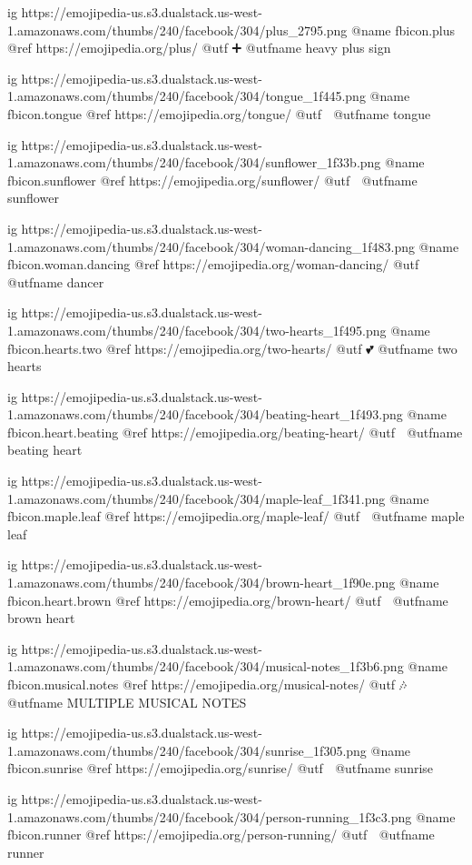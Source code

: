 	ig https://emojipedia-us.s3.dualstack.us-west-1.amazonaws.com/thumbs/240/facebook/304/plus_2795.png
	@name fbicon.plus
	@ref https://emojipedia.org/plus/
	@utf ➕
	@utfname heavy plus sign

	ig https://emojipedia-us.s3.dualstack.us-west-1.amazonaws.com/thumbs/240/facebook/304/tongue_1f445.png
	@name fbicon.tongue
	@ref https://emojipedia.org/tongue/
	@utf 👅
	@utfname tongue

	ig https://emojipedia-us.s3.dualstack.us-west-1.amazonaws.com/thumbs/240/facebook/304/sunflower_1f33b.png
	@name fbicon.sunflower
	@ref https://emojipedia.org/sunflower/
	@utf 🌻
	@utfname sunflower

	ig https://emojipedia-us.s3.dualstack.us-west-1.amazonaws.com/thumbs/240/facebook/304/woman-dancing_1f483.png
	@name fbicon.woman.dancing
	@ref https://emojipedia.org/woman-dancing/
	@utf 💃
	@utfname dancer

	ig https://emojipedia-us.s3.dualstack.us-west-1.amazonaws.com/thumbs/240/facebook/304/two-hearts_1f495.png
	@name fbicon.hearts.two
	@ref https://emojipedia.org/two-hearts/
	@utf 💕
	@utfname two hearts

	ig https://emojipedia-us.s3.dualstack.us-west-1.amazonaws.com/thumbs/240/facebook/304/beating-heart_1f493.png
	@name fbicon.heart.beating
	@ref https://emojipedia.org/beating-heart/
	@utf 💓
	@utfname beating heart

	ig https://emojipedia-us.s3.dualstack.us-west-1.amazonaws.com/thumbs/240/facebook/304/maple-leaf_1f341.png
	@name fbicon.maple.leaf
	@ref https://emojipedia.org/maple-leaf/
	@utf 🍁
	@utfname maple leaf

	ig https://emojipedia-us.s3.dualstack.us-west-1.amazonaws.com/thumbs/240/facebook/304/brown-heart_1f90e.png
	@name fbicon.heart.brown
	@ref https://emojipedia.org/brown-heart/
	@utf 🤎
	@utfname brown heart

	ig https://emojipedia-us.s3.dualstack.us-west-1.amazonaws.com/thumbs/240/facebook/304/musical-notes_1f3b6.png
	@name fbicon.musical.notes
	@ref https://emojipedia.org/musical-notes/
	@utf 🎶
	@utfname MULTIPLE MUSICAL NOTES

	ig https://emojipedia-us.s3.dualstack.us-west-1.amazonaws.com/thumbs/240/facebook/304/sunrise_1f305.png
	@name fbicon.sunrise
	@ref https://emojipedia.org/sunrise/
	@utf 🌅
	@utfname sunrise

	ig https://emojipedia-us.s3.dualstack.us-west-1.amazonaws.com/thumbs/240/facebook/304/person-running_1f3c3.png
	@name fbicon.runner
	@ref https://emojipedia.org/person-running/
	@utf 🏃
	@utfname runner

